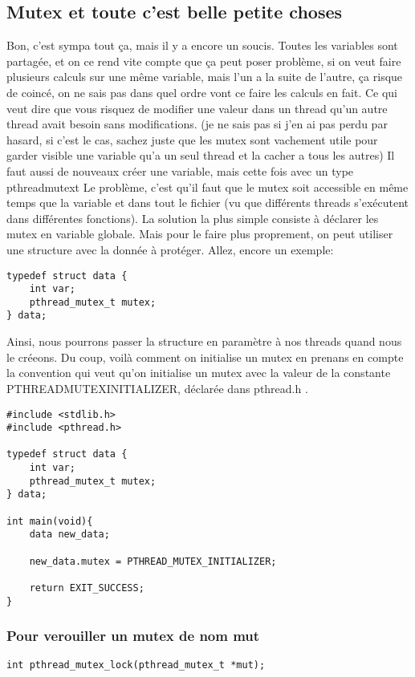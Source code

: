 \documentclass[a4paper]{article}
\begin{document}
\subsection{Mutex et toute c'est belle petite choses}
Bon, c'est sympa tout ça, mais il y a encore un soucis. Toutes les variables sont partagée, et on ce rend vite compte que ça peut poser problème, si on veut faire plusieurs calculs sur une même variable, mais l'un a la suite de l'autre, ça risque de coincé, on ne sais pas dans quel ordre vont ce faire les calculs en fait. Ce qui veut dire que vous risquez de modifier une valeur dans un thread qu'un autre thread avait besoin sans modifications. (je ne sais pas si j'en ai pas perdu par hasard, si c'est le cas, sachez juste que les mutex sont vachement utile pour garder visible une variable qu'a un seul thread et la cacher a tous les autres)\newline
Il faut aussi de nouveaux créer une variable, mais cette fois avec un type \guillemotleft{}pthread\textunderscore{}mutex\textunderscore{}t\guillemotright{}\newline
Le problème, c'est qu'il faut que le mutex soit accessible en même temps que la variable et dans tout le fichier (vu que différents threads s'exécutent dans différentes fonctions). La solution la plus simple consiste à déclarer les mutex en variable globale. Mais pour le faire plus proprement, on peut utiliser une structure avec la donnée à protéger. Allez, encore un exemple:
\begin{lstlisting}
typedef struct data {
    int var;
    pthread_mutex_t mutex;
} data;
\end{lstlisting}
Ainsi, nous pourrons passer la structure en paramètre à nos threads quand nous le créeons.\newline
Du coup, voilà comment on initialise un mutex en prenans en compte la convention qui veut qu'on initialise un mutex avec la valeur de la constante PTHREAD\textunderscore{}MUTEX\textunderscore{}INITIALIZER, déclarée dans pthread.h .
\begin{lstlisting}
#include <stdlib.h>
#include <pthread.h>

typedef struct data {
    int var;
    pthread_mutex_t mutex;
} data;

int main(void){
    data new_data;

    new_data.mutex = PTHREAD_MUTEX_INITIALIZER;

    return EXIT_SUCCESS;
}
\end{lstlisting}

\subsubsection{Pour verouiller un mutex de nom mut}
\begin{lstlisting}
int pthread_mutex_lock(pthread_mutex_t *mut);
\end{lstlisting}
\end{document}
